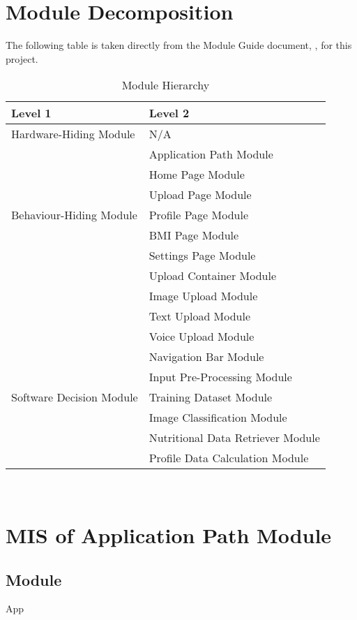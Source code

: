 \documentclass[12pt, titlepage]{article}
\begin{document}
\section{Module Decomposition}

The following table is taken directly from the Module Guide document, \cite{MG}, for this project.

\begin{table}[H]
	\centering
	\begin{tabular}{p{} p{}}
		\toprule
		\textbf{Level 1} & \textbf{Level 2}\\
		\midrule
		
		{Hardware-Hiding Module} & N/A \\
		\midrule
		
		\multirow{7}{0.3\textwidth}{Behaviour-Hiding Module} 
		& Application Path Module\\
		& Home Page Module\\
		& Upload Page Module\\
		& Profile Page Module\\
		& BMI Page Module\\
		& Settings Page Module\\
		& Upload Container Module \\
		& Image Upload Module\\
		& Text Upload Module \\
		& Voice Upload Module \\
		& Navigation Bar Module\\ 
		\midrule
		
		\multirow{3}{0.3\textwidth}{Software Decision Module} & Input Pre-Processing Module\\
		& Training Dataset Module\\
		& Image Classification Module\\
		& Nutritional Data Retriever Module\\
		& Profile Data Calculation Module\\
		\bottomrule
		
	\end{tabular}
	\caption{Module Hierarchy}
	\label{TblMH}
\end{table}

~\newpage

\section{MIS of Application Path Module} \label{App}
\subsection{Module}
App
\end{document}
